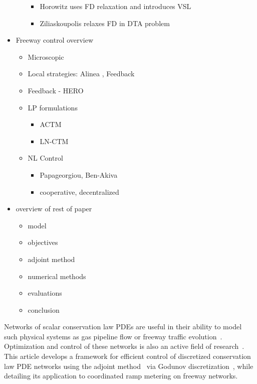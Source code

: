 \begin{itemize}
\begin{itemize}
\begin{itemize}
      \item Horowitz uses FD relaxation and introduces VSL \cite{gomes2006optimal,Muralidharana}
      \item Ziliaskoupolis relaxes FD in DTA problem \cite{ziliaskopoulos2000linear}
    \end{itemize}
  \end{itemize}
  \item Freeway control overview
  \begin{itemize}
  \item Microscopic \cite{Ben-Akiva2003}
  \item Local strategies: Alinea \cite{Papageorgiou1991}, Feedback \cite{Kachroo2003}
    \item Feedback - HERO \cite{Papamichail2008}
    \item LP formulations
    \begin{itemize}
      \item ACTM \cite{gomes2006optimal}
      \item LN-CTM \cite{Muralidharana}
    \end{itemize}
    \item NL Control
    \begin{itemize}
          \item \cite{Kotsialos2004,Chen1997} Papageorgiou, Ben-Akiva
          \item cooperative, decentralized \cite{Ramon2013,Frejo2011}
        \end{itemize}
  \end{itemize}
  \item overview of rest of paper
  \begin{itemize}
    \item model
    \item objectives
    \item adjoint method
    \item numerical methods
    \item evaluations
    \item conclusion
  \end{itemize}
\end{itemize}


Networks of scalar conservation law PDEs are useful in their ability to model such physical systems as gas pipeline flow or freeway traffic evolution~\cite{garavello2006traffic,work2010traffic}. Optimization and control of these networks is also an active field of research~\cite{Gugat2005,Bayen2006,Kotsialos2004}. This article develops a framework for efficient control of discretized conservation law PDE networks using the adjoint method~\cite{Giles2000,Pironneau1974} via Godunov discretization~\cite{godunov1959}, while detailing its application to coordinated ramp metering on freeway networks.

